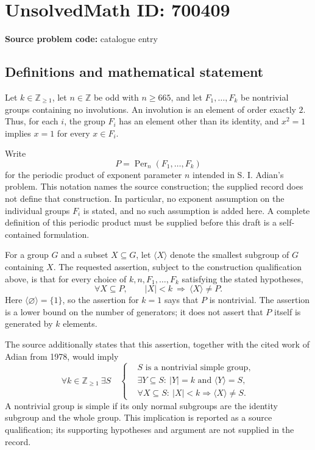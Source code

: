 \documentclass[11pt]{article}
\newcommand{\Z}{\mathbb{Z}}
\begin{document}
\section*{UnsolvedMath ID: 700409}
\textbf{Source problem code:} catalogue entry
\subsection{Definitions and mathematical statement}
Let \(k\in\Z_{\geq 1}\), let \(n\in\Z\) be odd with \(n\geq 665\), and let \(F_1,\ldots,F_k\) be nontrivial groups containing no involutions. An involution is an element of order exactly \(2\). Thus, for each \(i\), the group \(F_i\) has an element other than its identity, and \(x^2=1\) implies \(x=1\) for every \(x\in F_i\).

Write
\[
P=\operatorname{Per}_n(F_1,\ldots,F_k)
\]
for the periodic product of exponent parameter \(n\) intended in S. I. Adian's problem. This notation names the source construction; the supplied record does not define that construction. In particular, no exponent assumption on the individual groups \(F_i\) is stated, and no such assumption is added here. A complete definition of this periodic product must be supplied before this draft is a self-contained formulation.

For a group \(G\) and a subset \(X\subseteq G\), let \(\langle X\rangle\) denote the smallest subgroup of \(G\) containing \(X\). The requested assertion, subject to the construction qualification above, is that for every choice of \(k,n,F_1,\ldots,F_k\) satisfying the stated hypotheses,
\[
\forall X\subseteq P,\qquad |X|<k\ \Longrightarrow\ \langle X\rangle\neq P.
\]
Here \(\langle\varnothing\rangle=\{1\}\), so the assertion for \(k=1\) says that \(P\) is nontrivial. The assertion is a lower bound on the number of generators; it does not assert that \(P\) itself is generated by \(k\) elements.

The source additionally states that this assertion, together with the cited work of Adian from 1978, would imply
\[
\forall k\in\Z_{\geq1}\ \exists S\quad
\left\{
\begin{aligned}
&S\text{ is a nontrivial simple group},\\
&\exists Y\subseteq S:\ |Y|=k\text{ and }\langle Y\rangle=S,\\
&\forall X\subseteq S:\ |X|<k\Longrightarrow\langle X\rangle\neq S.
\end{aligned}
\right.
\]
A nontrivial group is simple if its only normal subgroups are the identity subgroup and the whole group. This implication is reported as a source qualification; its supporting hypotheses and argument are not supplied in the record.
\end{document}
